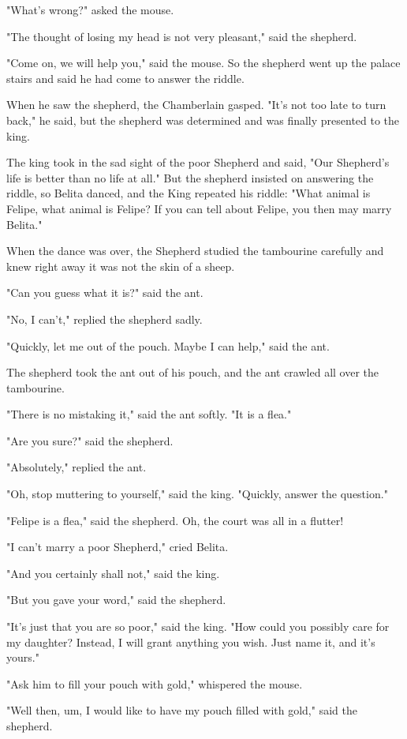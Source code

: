 "What's wrong?" asked the mouse.

"The thought of losing my head is not very pleasant," said the shepherd.

"Come on, we will help you," said the mouse. So the shepherd went up the palace stairs and said he had come to answer the riddle.

When he saw the shepherd, the Chamberlain gasped. "It's not too late to turn back," he said, but the shepherd was determined and was finally presented to the king.

The king took in the sad sight of the poor Shepherd and said, "Our Shepherd's life is better than no life at all." But the shepherd insisted on answering the riddle, so Belita danced, and the King repeated his riddle: "What animal is Felipe, what animal is Felipe? If you can tell about Felipe, you then may marry Belita."

When the dance was over, the Shepherd studied the tambourine carefully and knew right away it was not the skin of a sheep.

"Can you guess what it is?" said the ant.

"No, I can't," replied the shepherd sadly.

"Quickly, let me out of the pouch. Maybe I can help," said the ant.

The shepherd took the ant out of his pouch, and the ant crawled all over the tambourine.

"There is no mistaking it," said the ant softly. "It is a flea."

"Are you sure?" said the shepherd.

"Absolutely," replied the ant.

"Oh, stop muttering to yourself," said the king. "Quickly, answer the question."

"Felipe is a flea," said the shepherd. Oh, the court was all in a flutter!

"I can't marry a poor Shepherd," cried Belita.

"And you certainly shall not," said the king.

"But you gave your word," said the shepherd.

"It's just that you are so poor," said the king. "How could you possibly care for my daughter? Instead, I will grant anything you wish. Just name it, and it's yours."

"Ask him to fill your pouch with gold," whispered the mouse.

"Well then, um, I would like to have my pouch filled with gold," said the shepherd.

